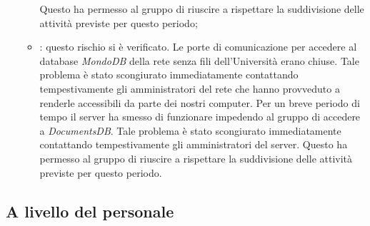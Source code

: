 \begin{itemize}
\begin{itemize}
				Questo ha permesso al gruppo di riuscire a rispettare la suddivisione delle attività previste per questo periodo;
				\item \textbf{\CO}: questo rischio si è verificato. Le porte di comunicazione per accedere al database \textit{MondoDB} della rete senza fili dell'Università erano chiuse. Tale problema è stato scongiurato immediatamente contattando tempestivamente gli amministratori del rete che hanno provveduto a renderle accessibili da parte dei nostri computer.  
				Per un breve periodo di tempo il server ha smesso di funzionare impedendo al gruppo di accedere a \textit{DocumentsDB}. Tale problema è stato scongiurato immediatamente contattando tempestivamente gli amministratori del server. 
				Questo ha permesso al gruppo di riuscire a rispettare la suddivisione delle attività previste per questo periodo. 
			\end{itemize}
		\end{itemize}	
	
	\subsection{A livello del personale}
	
